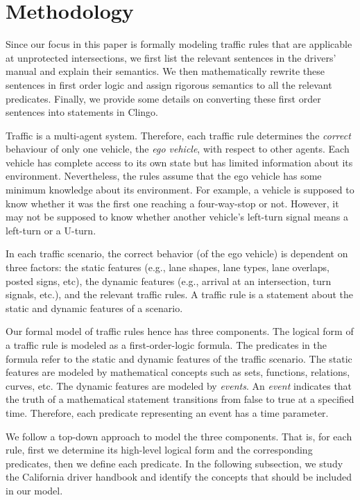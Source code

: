 \section{Methodology}
Since our focus in this paper is formally modeling traffic rules that are applicable at unprotected intersections, we first list the relevant sentences in the drivers' manual and explain their semantics. We then mathematically rewrite these sentences in first order logic and assign rigorous semantics to all the relevant predicates. Finally, we provide some details on converting these first order sentences into statements in Clingo. 

Traffic is a multi-agent system.
Therefore, each traffic rule determines the \emph{correct} behaviour of only one vehicle, the \emph{ego vehicle},
with respect to other agents.
Each vehicle has complete access to its own state but has limited information about its environment.
Nevertheless,
the rules assume that the ego vehicle has some minimum knowledge about its environment.
For example, a vehicle is supposed to know whether it was the first one reaching a four-way-stop or not.
However, it may not be supposed to know whether another vehicle's left-turn signal means a left-turn or a U-turn.


In each traffic scenario,
the correct behavior (of the ego vehicle) is dependent on three factors:
the static features (e.g., lane shapes, lane types, lane overlaps, posted signs, etc),
the dynamic features (e.g., arrival at an intersection, turn signals, etc.),
and the relevant traffic rules.
A traffic rule is a statement about the static and dynamic features of a scenario.

Our formal model of traffic rules hence has three components.
The logical form of a traffic rule is modeled as a first-order-logic formula.
The predicates in the formula refer to the static and dynamic features
of the traffic scenario.
The static features are modeled by mathematical concepts
such as sets, functions, relations, curves, etc.
The dynamic features are modeled by \emph{events}.
An \emph{event} indicates that the truth of a mathematical statement
transitions from false to true at a specified time.
Therefore,
each predicate representing an event has a time parameter.

We follow a top-down approach to model the three components.
That is,
for each rule,
first we determine its high-level logical form and the corresponding predicates,
then we define each predicate.
In the following subsection,
we study the California driver handbook and
identify the concepts that should be included in our model.

